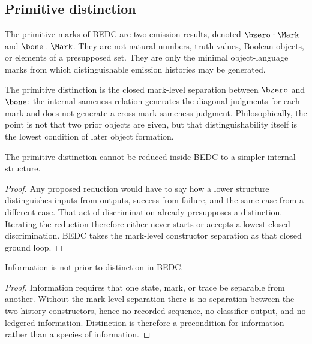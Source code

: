 \subsection{Primitive distinction}
\label{subsec:primitive-distinction}

\begin{definition}
\label{def:philosophy-primitive-marks}
The primitive marks of BEDC are two emission results, denoted
\(\bzero : \Mark\) and \(\bone : \Mark\). They are not natural
numbers, truth values, Boolean objects, or elements of a presupposed
set. They are only the minimal object-language marks from which
distinguishable emission histories may be generated.
\end{definition}

\begin{definition}
\label{def:philosophy-primitive-distinction}
The primitive distinction is the closed mark-level separation between
\(\bzero\) and \(\bone\): the internal sameness relation generates the
diagonal judgments for each mark and does not generate a cross-mark
sameness judgment. Philosophically, the point is not that two prior
objects are given, but that distinguishability itself is the lowest
condition of later object formation.
\end{definition}

\begin{theorem}
\label{thm:philosophy-primitive-distinction-irreducible}
The primitive distinction cannot be reduced inside BEDC to a simpler
internal structure.
\end{theorem}
\begin{proof}
Any proposed reduction would have to say how a lower structure
distinguishes inputs from outputs, success from failure, and the same
case from a different case. That act of discrimination already
presupposes a distinction. Iterating the reduction therefore either
never starts or accepts a lowest closed discrimination. BEDC takes the
mark-level constructor separation as that closed ground loop.
\end{proof}

\begin{corollary}
\label{cor:philosophy-distinction-precedes-information}
Information is not prior to distinction in BEDC.
\end{corollary}
\begin{proof}
Information requires that one state, mark, or trace be separable from
another. Without the mark-level separation there is no separation
between the two history constructors, hence no recorded sequence, no
classifier output, and no ledgered information. Distinction is
therefore a precondition for information rather than a species of
information.
\end{proof}

